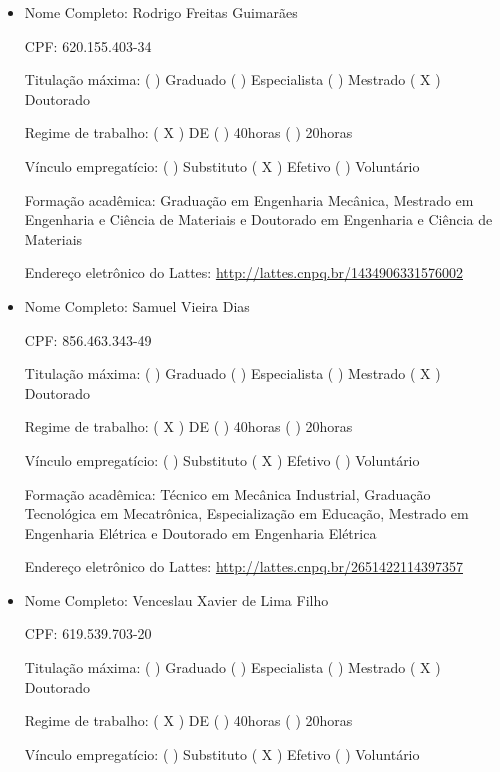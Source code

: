 \documentclass{paper}
\def\web#1{\href{#1}{#1}}
\begin{document}
\begin{itemize}
 Vínculo empregatício: (  ) Substituto  ( X ) Efetivo  (  ) Voluntário

 Formação acadêmica: Graduação Tecnológica em Mecatrônica, Mestrado em Engenharia de Teleinformática e Doutorado em
Engenharia de Teleinformática

 Endereço eletrônico do Lattes: \web{http://lattes.cnpq.br/4347965302097614}


\item Nome Completo: Rodrigo Freitas Guimarães

 CPF: 620.155.403-34

 Titulação máxima: (  ) Graduado  (  ) Especialista  (  ) Mestrado ( X ) Doutorado

 Regime de trabalho: ( X ) DE  (  ) 40horas (  ) 20horas

 Vínculo empregatício: (  ) Substituto  ( X ) Efetivo  (  ) Voluntário

 Formação acadêmica: Graduação em Engenharia Mecânica, Mestrado em Engenharia e Ciência de Materiais e Doutorado em
Engenharia e Ciência de Materiais

 Endereço eletrônico do Lattes: \web{http://lattes.cnpq.br/1434906331576002}


\item Nome Completo: Samuel Vieira Dias

 CPF: 856.463.343-49

 Titulação máxima: (  ) Graduado (  ) Especialista  (  ) Mestrado ( X ) Doutorado

 Regime de trabalho: ( X ) DE  (  ) 40horas (  ) 20horas

 Vínculo empregatício: (  ) Substituto  ( X ) Efetivo  (  ) Voluntário

 Formação acadêmica: Técnico em Mecânica Industrial, Graduação Tecnológica em Mecatrônica, Especialização em Educação, Mestrado em Engenharia Elétrica e Doutorado em Engenharia Elétrica

 Endereço eletrônico do Lattes: \web{http://lattes.cnpq.br/2651422114397357}


\item Nome Completo: Venceslau Xavier de Lima Filho

 CPF: 619.539.703-20

 Titulação máxima: (  ) Graduado  (  ) Especialista  (  ) Mestrado ( X ) Doutorado

 Regime de trabalho: ( X ) DE  (  ) 40horas (  ) 20horas

 Vínculo empregatício: (  ) Substituto  ( X ) Efetivo  (  ) Voluntário


\end{itemize}
\end{document}
